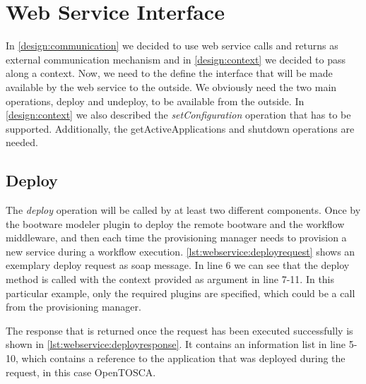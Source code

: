 \section{Web Service Interface}
\label{implementation:webservice}

In \autoref{design:communication} we decided to use web service calls and returns as external communication mechanism and in \autoref{design:context} we decided to pass along a context.
Now, we need to the define the interface that will be made available by the web service to the outside.
We obviously need the two main operations, deploy and undeploy, to be available from the outside.
In \autoref{design:context} we also described the \textit{setConfiguration} operation that has to be supported.
Additionally, the getActiveApplications and shutdown operations are needed.

\subsection{Deploy}

The \textit{deploy} operation will be called by at least two different components.
Once by the bootware modeler plugin to deploy the remote bootware and the workflow middleware, and then each time the provisioning manager needs to provision a new service during a workflow execution.
\autoref{lst:webservice:deployrequest} shows an exemplary deploy request as soap message.
In line 6 we can see that the deploy method is called with the context provided as argument in line 7-11.
In this particular example, only the required plugins are specified, which could be a call from the provisioning manager.

\vspace*{\baselineskip}

The response that is returned once the request has been executed successfully is shown in \autoref{lst:webservice:deployresponse}.
It contains an information list in line 5-10, which contains a reference to the application that was deployed during the request, in this case OpenTOSCA.

\vspace*{\baselineskip}

